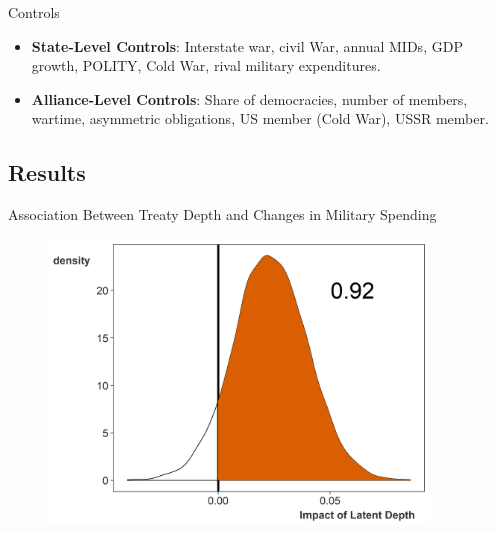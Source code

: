 \documentclass[12pt]{beamer}
\begin{document}

\begin{frame}{Controls}

\begin{itemize}
\item \textbf{State-Level Controls}: Interstate war, civil War, annual MIDs, GDP growth, POLITY, Cold War, rival military expenditures. 
\pause 
\item \textbf{Alliance-Level Controls}: Share of democracies, number of members, wartime, asymmetric obligations, US member (Cold War), USSR member.

\end{itemize} 

\end{frame}



\subsection{Results}


\begin{frame}{Association Between Treaty Depth and Changes in Military Spending} 

\begin{figure}
	\centering
		\includegraphics[width=0.90\textwidth]{depth-post.png}
	\label{fig:depth-post}
\end{figure}


\end{frame}
\end{document}
